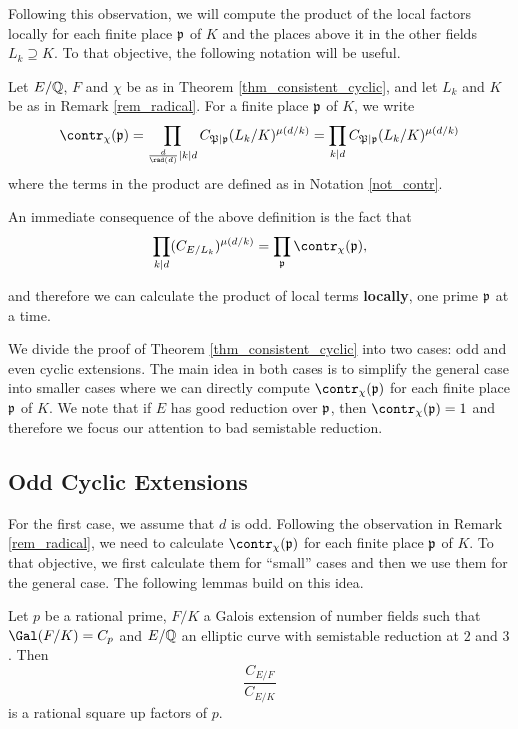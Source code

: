 Following this observation, we will compute the product of the local factors locally for each finite place $\mathfrak{p}$ of $K$ and the places above it in the other fields $L_k\supseteq K$. To that objective, the following notation will be useful.

\begin{notation}\label{not_local_contr}
    Let $E/\mathbb{Q}$, $F$ and $\chi$ be as in Theorem \ref*{thm_consistent_cyclic}, and let $L_k$ and $K$ be as in Remark \ref*{rem_radical}. For a finite place $\mathfrak{p}$ of $K$, we write
    $$\contr_\chi(\pp)=\prod_{\frac{d}{\rad(d)}\mid k\mid d}C_{\mathfrak{P}\mid\pp}(L_k/K)^{\mu(d/k)}=\prod_{k\mid d}C_{\mathfrak{P}\mid\pp}(L_k/K)^{\mu(d/k)}$$ 
    where the terms in the product are defined as in Notation \ref*{not_contr}. 
\end{notation}

An immediate consequence of the above definition is the fact that 
\begin{equation}\label{eqn_local_contr}
    \prod_{k\mid d}(C_{E/L_k})^{\mu(d/k)}=\prod_\pp\contr_\chi(\pp),
\end{equation}

and therefore we can calculate the product of local terms \textbf{locally}, one prime $\mathfrak{p}$ at a time.

We divide the proof of Theorem \ref*{thm_consistent_cyclic} into two cases: odd and even cyclic extensions. The main idea in both cases is to simplify the general case into smaller cases where we can directly compute $\contr_\chi(\pp)$ for each finite place $\mathfrak{p}$ of $K$. We note that if $E$ has good reduction over $\mathfrak{p}$, then $\contr_\chi(\pp)=1$ and therefore we focus our attention to bad semistable reduction. 

\subsection*{Odd Cyclic Extensions} \label{case_Cp}

For the first case, we assume that $d$ is odd. Following the observation in Remark \ref*{rem_radical}, we need to calculate $\contr_\chi(\pp)$ for each finite place $\mathfrak{p}$ of $K$. To that objective, we first calculate them for ``small'' cases and then we use them for the general case. The following lemmas build on this idea.

\begin{lemma}\label{lem_Cp}
    Let $p$ be a rational prime, $F/K$ a Galois extension of number fields such that $\Gal(F/K)=C_p$ and $E/\mathbb{Q}$ an elliptic curve with semistable reduction at $2$ and $3$. Then 
    $$\frac{C_{E/F}}{C_{E/K}}$$
    is a rational square up factors of $p$.
\end{lemma}

